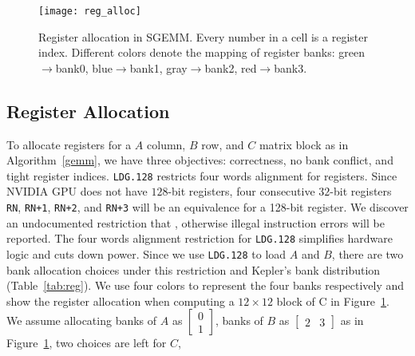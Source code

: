 \label{sec:register}
\begin{figure}[htbp]
\begin{center}
\texttt{[image: reg\_alloc]}
\caption{\small Register allocation in SGEMM. Every number in a cell is a register index.
Different colors denote the mapping of register banks: green$\rightarrow$bank0,
    blue$\rightarrow$bank1, gray$\rightarrow$bank2, red$\rightarrow$bank3.}
\label{fig:reg}
\end{center}
\end{figure}
\subsection{Register Allocation}

To allocate registers for a $A$ column, $B$ row, and $C$ matrix block as in Algorithm~\ref{gemm}, we have three objectives:
correctness, no bank conflict, and tight register indices.
{\tt LDG.128} restricts four words alignment for registers.
Since NVIDIA GPU does not have $128$-bit registers, 
four consecutive $32$-bit registers {\tt RN}, {\tt RN+1}, {\tt RN+2}, and {\tt RN+3} will be an equivalence for a 128-bit
register.
We discover an undocumented restriction that ,
otherwise illegal instruction errors will be reported.
The four words alignment restriction for {\tt LDG.128} simplifies hardware logic and cuts down power.
Since we use {\tt LDG.128} to load $A$ and $B$, there are two bank allocation choices under this restriction and Kepler's bank distribution (Table~\ref{tab:reg}).
We use four colors to represent the four banks respectively and show the register allocation when computing a $12 \times 12$ block of C in Figure~\ref{fig:reg}.
We assume allocating banks of $A$ as $\begin{bmatrix} 0 \\ 1  \end{bmatrix}$,
   banks of $B$ as $\begin{bmatrix} 2 & 3 \end{bmatrix}$ 
   as in Figure~\ref{fig:reg}, two choices are left for $C$,
